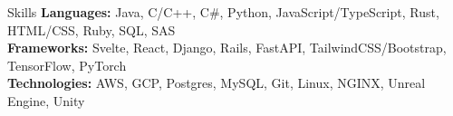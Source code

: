 \documentclass{resume} %
\begin{document}


\begin{rSection}{Skills} 
\textbf{Languages:} Java, C/C++, C\#, Python, JavaScript/TypeScript, Rust, HTML/CSS, Ruby, SQL, SAS \\
\textbf{Frameworks:} Svelte, React, Django, Rails, FastAPI, TailwindCSS/Bootstrap, TensorFlow, PyTorch\\
\textbf{Technologies:} AWS, GCP, Postgres, MySQL, Git, Linux, NGINX, Unreal Engine, Unity

\end{rSection}
\end{document}
